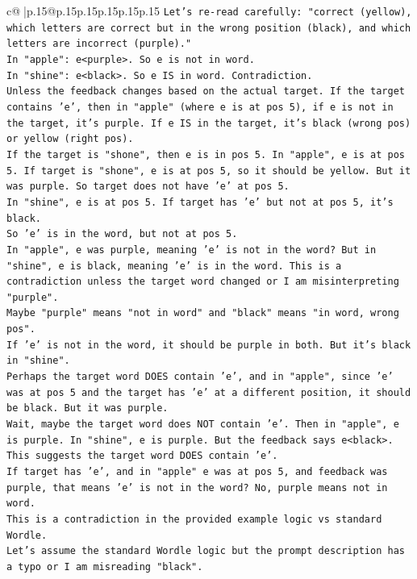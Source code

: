 \documentclass{article}
\begin{document}
{\begin{supertabular}{c@{$\;$}|p{.15\linewidth}@{}p{.15\linewidth}p{.15\linewidth}p{.15\linewidth}p{.15\linewidth}p{.15\linewidth}}
{{{\texttt{Let's re{-}read carefully: "correct (yellow), which letters are correct but in the wrong position (black), and which letters are incorrect (purple)."} \\
\texttt{In "apple": e<purple>. So e is not in word.} \\
\texttt{In "shine": e<black>. So e IS in word. Contradiction.} \\
\texttt{Unless the feedback changes based on the actual target. If the target contains 'e', then in "apple" (where e is at pos 5), if e is not in the target, it's purple. If e IS in the target, it's black (wrong pos) or yellow (right pos).} \\
\texttt{If the target is "shone", then e is in pos 5. In "apple", e is at pos 5. If target is "shone", e is at pos 5, so it should be yellow. But it was purple. So target does not have 'e' at pos 5.} \\
\texttt{In "shine", e is at pos 5. If target has 'e' but not at pos 5, it's black.} \\
\texttt{So 'e' is in the word, but not at pos 5.} \\
\texttt{In "apple", e was purple, meaning 'e' is not in the word? But in "shine", e is black, meaning 'e' is in the word. This is a contradiction unless the target word changed or I am misinterpreting "purple".} \\
\texttt{Maybe "purple" means "not in word" and "black" means "in word, wrong pos".} \\
\texttt{If 'e' is not in the word, it should be purple in both. But it's black in "shine".} \\
\texttt{Perhaps the target word DOES contain 'e', and in "apple", since 'e' was at pos 5 and the target has 'e' at a different position, it should be black. But it was purple.} \\
\texttt{Wait, maybe the target word does NOT contain 'e'. Then in "apple", e is purple. In "shine", e is purple. But the feedback says e<black>.} \\
\texttt{This suggests the target word DOES contain 'e'.} \\
\texttt{If target has 'e', and in "apple" e was at pos 5, and feedback was purple, that means 'e' is not in the word? No, purple means not in word.} \\
\texttt{This is a contradiction in the provided example logic vs standard Wordle.} \\
\texttt{Let's assume the standard Wordle logic but the prompt description has a typo or I am misreading "black".} \\
}}}
\end{supertabular}}
\end{document}
